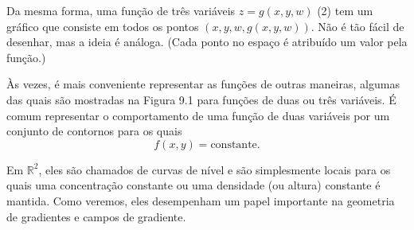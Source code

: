 Da mesma forma, uma função de três variáveis
$z = g (x, y, w)$ (2)
tem um gráfico que consiste em todos os pontos $(x, y, w, g (x, y, w))$. Não é tão fácil de desenhar, mas a ideia é análoga. (Cada ponto no espaço é atribuído um valor pela função.)

Às vezes, é mais conveniente representar as funções de outras maneiras, algumas das quais são mostradas na Figura 9.1 para funções de duas ou três variáveis. É comum representar o comportamento de uma função de duas variáveis por um conjunto de contornos para os quais
\begin{equation}
f(x, y) = \mbox{constante}.
\end{equation}
    
Em $\mathbb{R}^{2}$, eles são chamados de curvas de nível e são simplesmente locais para os quais uma concentração constante ou uma densidade (ou altura) constante é mantida. Como veremos, eles desempenham um papel importante na geometria de gradientes e campos de gradiente.

